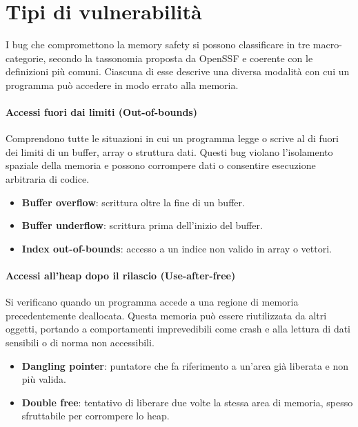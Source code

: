 \section{Tipi di vulnerabilità}
\label{sec:vulnerability_types}

I bug che compromettono la memory safety si possono classificare in tre macro-categorie,
secondo la tassonomia proposta da OpenSSF\cite{memory_safety_continuum_definition}
e coerente con le definizioni più comuni\cite{wikipedia_definition}. Ciascuna di
esse descrive una diversa modalità con cui un programma può accedere in modo errato
alla memoria.

\paragraph{Accessi fuori dai limiti (Out-of-bounds)}
\label{sec:oob}

Comprendono tutte le situazioni in cui un programma legge o scrive al di fuori dei
limiti di un buffer, array o struttura dati. Questi bug violano l'isolamento spaziale
della memoria e possono corrompere dati o consentire esecuzione arbitraria di codice.

\begin{itemize}
  \item \textbf{Buffer overflow}: scrittura oltre la fine di un buffer.

  \item \textbf{Buffer underflow}: scrittura prima dell'inizio del buffer.

  \item \textbf{Index out-of-bounds}: accesso a un indice non valido in array o vettori.
\end{itemize}

\paragraph{Accessi all'heap dopo il rilascio (Use-after-free)}
\label{sec:uaf}

Si verificano quando un programma accede a una regione di memoria
precedentemente deallocata. Questa memoria può essere riutilizzata da altri oggetti,
portando a comportamenti imprevedibili come crash e alla lettura di dati
sensibili o di norma non accessibili.

\begin{itemize}
  \item \textbf{Dangling pointer}: puntatore che fa riferimento a un'area già liberata
    e non più valida.

  \item \textbf{Double free}: tentativo di liberare due volte la stessa area di memoria,
    spesso sfruttabile per corrompere lo heap.
\end{itemize}


